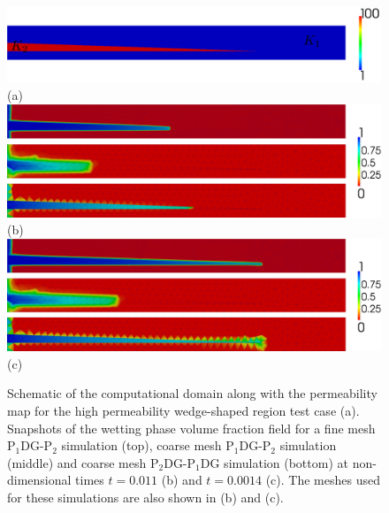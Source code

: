\documentclass[times]{fldauth}
\newcommand{\PN}[2][error]{P$_{#1}$DG-P$_{#2}$}
\begin{document}
\begin{figure}[h!]
  \vbox{
    \hbox{
      \hspace{-0.cm}\includegraphics[width=1.0\textwidth]{wedge_permeabilityv2}}
    \vspace{-1.cm}\hbox{\hspace{4cm}(a)}
    \vspace{.5cm}
    \hbox{
      \hspace{-0.cm}\includegraphics[width=1.0\textwidth]{wedge_0011}}
    \vspace{-0.cm}\hbox{\hspace{4cm}(b)}
    \vspace{.5cm}
    \hbox{
      \hspace{-.cm}\includegraphics[width=1.0\textwidth]{wedge_0014}}
    \vspace{-0.cm}\hbox{\hspace{4cm}(c)}
  }
  \caption{Schematic of the computational domain along with the
    permeability map for the high permeability wedge-shaped region
    test case (a). Snapshots of the wetting phase volume fraction
    field for a fine mesh \PN[1]{2} simulation (top), coarse mesh
    \PN[1]{2} simulation (middle) and coarse mesh \PN[2]{1}DG
    simulation (bottom) at non-dimensional times $t = 0.011$ (b) and
    $t=0.0014$ (c). The meshes used for these simulations are also
    shown in (b) and (c).
    \label{fig:wedge_permeability}}
\end{figure}
\end{document}
